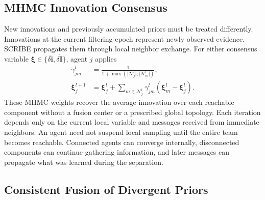 \documentclass[letterpaper,10pt,conference]{ieeeconf}
\begin{document}
\subsection{MHMC Innovation Consensus}

New innovations and previously accumulated priors must be treated
differently. Innovations at the current filtering epoch represent newly
observed evidence. SCRIBE propagates them through local neighbor exchange. For
either consensus variable
$\bm{\xi}\in\{\overline{\delta\bm{i}},
\overline{\delta\bm{I}}\}$, agent $j$ applies
\begin{align}
    \gamma_{jm}^{l}
    &=\frac{1}{1+\max\left(
        \lvert\mathcal{N}_j^{l}\rvert,
        \lvert\mathcal{N}_m^{l}\rvert
      \right)},\\
    \bm{\xi}_j^{l+1}
    &=\bm{\xi}_j^{l}
      +\sum_{m\in\mathcal{N}_j^{l}}
      \gamma_{jm}^{l}\left(\bm{\xi}_m^{l}-\bm{\xi}_j^{l}\right).
    \label{eq:mhmc}
\end{align}
These MHMC weights recover the average innovation over each reachable
component without a fusion center or a prescribed global topology. Each
iteration depends only on the current local variable and messages received
from immediate neighbors. An agent need not suspend local sampling until the
entire team becomes reachable. Connected agents can converge internally,
disconnected components can continue gathering information, and later
messages can propagate what was learned during the separation.

\subsection{Consistent Fusion of Divergent Priors}
\end{document}
